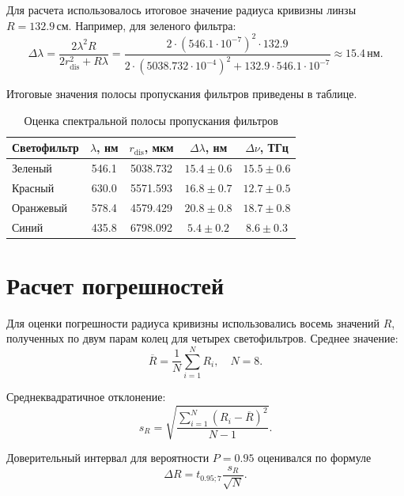 \documentclass[12pt,a4paper]{article}
\newcommand{\nm}{\ensuremath{\,\text{нм}}}
\newcommand{\cm}{\ensuremath{\,\text{см}}}
\begin{document}
Для расчета использовалось итоговое значение радиуса кривизны линзы $R=132.9\cm$. Например, для зеленого фильтра:
\begin{equation}
    \Delta\lambda =
    \frac{2\lambda^2 R}{2r_{\text{dis}}^2+R\lambda}
    =\frac{2\cdot(546.1\cdot10^{-7})^2\cdot132.9}{2\cdot(5038.732\cdot10^{-4})^2+132.9\cdot546.1\cdot10^{-7}}
    \approx 15.4\nm.
\end{equation}

Итоговые значения полосы пропускания фильтров приведены в таблице.

\begin{table}[H]
\centering
\small
\caption{Оценка спектральной полосы пропускания фильтров}
\begin{tabular}{lcccc}
\toprule
Светофильтр & $\lambda$, нм & $r_{\text{dis}}$, мкм & $\Delta\lambda$, нм & $\Delta\nu$, ТГц \\
\midrule
Зеленый & 546.1 & 5038.732 & $15.4 \pm 0.6$ & $15.5 \pm 0.6$ \\
Красный & 630.0 & 5571.593 & $16.8 \pm 0.7$ & $12.7 \pm 0.5$ \\
Оранжевый & 578.4 & 4579.429 & $20.8 \pm 0.8$ & $18.7 \pm 0.8$ \\
Синий & 435.8 & 6798.092 & $5.4 \pm 0.2$ & $8.6 \pm 0.3$ \\
\bottomrule
\end{tabular}
\end{table}

\section{Расчет погрешностей}

Для оценки погрешности радиуса кривизны использовались восемь значений $R$, полученных по двум парам колец для четырех светофильтров. Среднее значение:
\begin{equation}
    \overline R = \frac{1}{N}\sum_{i=1}^{N} R_i, \quad N=8.
\end{equation}

Среднеквадратичное отклонение:
\begin{equation}
    s_R = \sqrt{\frac{\sum\limits_{i=1}^{N}(R_i-\overline R)^2}{N-1}}.
\end{equation}

Доверительный интервал для вероятности $P=0.95$ оценивался по формуле
\begin{equation}
    \Delta R = t_{0.95;7}\frac{s_R}{\sqrt{N}}.
\end{equation}
\end{document}
